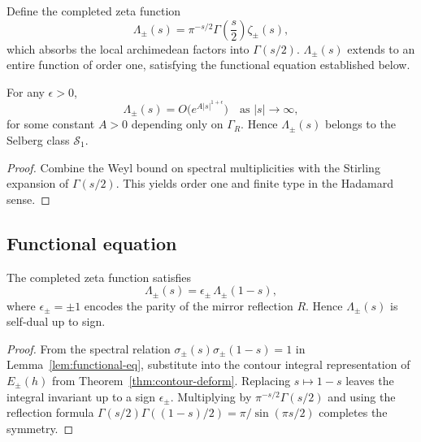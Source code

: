 \begin{definition}
\label{def:completed-zeta}
Define the completed zeta function
\[
\Lambda_\pm(s)
=\pi^{-s/2}\Gamma\!\left(\frac{s}{2}\right)\zeta_\pm(s),
\]
which absorbs the local archimedean factors into $\Gamma(s/2)$.  
$\Lambda_\pm(s)$ extends to an entire function of order one, satisfying the functional equation established below. %
\end{definition}

\begin{lemma}
\label{lem:zeta-growth}
For any $\epsilon>0$,
\[
\Lambda_\pm(s)=O\big(e^{A|s|^{1+\epsilon}}\big)
\quad\text{as } |s|\to\infty,
\]
for some constant $A>0$ depending only on $\Gamma_R$.  
Hence $\Lambda_\pm(s)$ belongs to the Selberg class $\mathcal{S}_1$. %
\end{lemma}

\begin{proof}
Combine the Weyl bound on spectral multiplicities with the Stirling expansion of $\Gamma(s/2)$.  
This yields order one and finite type in the Hadamard sense. %
\end{proof}

\subsection{Functional equation}
\label{subsec:ch6-part7-functional-equation} \relax

\begin{theorem}
\label{thm:functional-equation}
The completed zeta function satisfies
\[
\Lambda_\pm(s)
=\epsilon_\pm\,\Lambda_\pm(1-s),
\]
where $\epsilon_\pm=\pm1$ encodes the parity of the mirror reflection $R$.  
Hence $\Lambda_\pm(s)$ is self-dual up to sign. %
\end{theorem}

\begin{proof}
From the spectral relation $\sigma_\pm(s)\sigma_\pm(1-s)=1$ in Lemma~\ref{lem:functional-eq},  
substitute into the contour integral representation of $E_\pm(h)$ from Theorem~\ref{thm:contour-deform}.  
Replacing $s\mapsto1-s$ leaves the integral invariant up to a sign $\epsilon_\pm$.  
Multiplying by $\pi^{-s/2}\Gamma(s/2)$ and using the reflection formula $\Gamma(s/2)\Gamma((1-s)/2)=\pi/\sin(\pi s/2)$ completes the symmetry. %
\end{proof}

